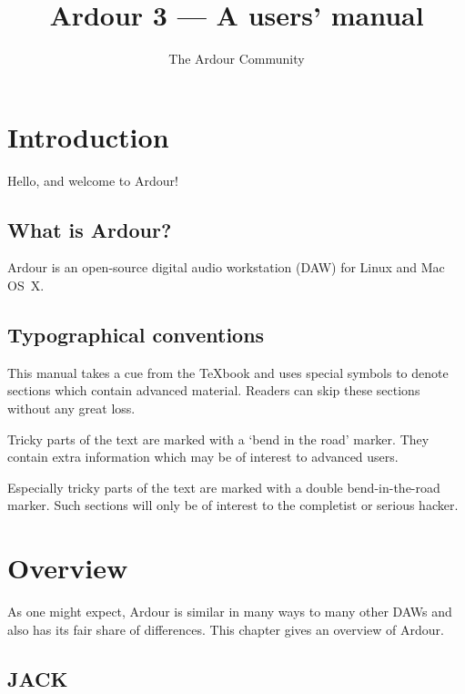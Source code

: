 \documentclass{book}
\title{Ardour 3 --- A users' manual}
\author{The Ardour Community}
\date{}
\begin{document}
\maketitle

\tableofcontents

\chapter{Introduction}

Hello, and welcome to Ardour!

\section{What is Ardour?}

Ardour is an open-source digital audio workstation (DAW) for Linux and Mac OS~X.


\section{Typographical conventions}

This manual takes a cue from the \TeX{}book and uses special symbols
to denote sections which contain advanced material.  Readers can
skip these sections without any great loss.

\begin{danger}
Tricky parts of the text are marked with a `bend in the road' marker.
They contain extra information which may be of interest to advanced
users.
\end{danger}

\begin{ddanger}
Especially tricky parts of the text are marked with a double
bend-in-the-road marker.  Such sections will only be of interest to
the completist or serious hacker.
\end{ddanger}


\chapter{Overview}

As one might expect, Ardour is similar in many ways to many other DAWs
and also has its fair share of differences.  This chapter gives an
overview of Ardour.


\section{JACK}
\end{document}
